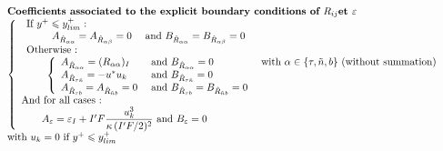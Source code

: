 \begin{equation}
\begin{array}{l}
\text{\bf Coefficients associated to the explicit boundary conditions of }
R_{ij} \text{\bf et } \varepsilon \\
\left\{\begin{array}{l}
\begin{array}{l}
\text{If }y^+\leqslant y^+_{lim}\text{~:}\\
\qquad\begin{array}{lll}
      A_{\hat R_{\alpha\alpha}} = A_{\hat R_{\alpha\beta}} = 0  &\text{ and } B_{\hat R_{\alpha\alpha}} =B_{\hat R_{\alpha\beta}}= 0 &
      \end{array}\\
\text{Otherwise~:}\\
\qquad\left\{\begin{array}{lll}
      A_{\hat R_{\alpha\alpha}} = (R_{\alpha\alpha})_I  &\text{ and } B_{\hat R_{\alpha\alpha}} = 0
         &\text{ with }\alpha \in \{\tau,\tilde{n},b\}\text{ (without summation)}\\
      A_{\hat R_{\tau \tilde{n}}} = -u^*u_k   &\text{ and } B_{\hat R_{\tau \tilde{n}}} = 0 &\\
      A_{\hat R_{\tau  b}} = A_{\hat R_{\tilde{n} b}} = 0   &\text{ and } B_{\hat R_{\tau b}} =B_{\hat R_{\tilde{n} b}} = 0 &\\
      \end{array}\right.
\end{array}\\
\text{And for all cases~:}\\
\qquad A_\varepsilon=\varepsilon_{I}+I'F\displaystyle\frac{ u_k^3}{\kappa\, (I'F/2)^2} \text{ and } B_\varepsilon= 0
\end{array}\right.\\
\text{with } u_k = 0 \text { if } y^+\leqslant y^+_{lim}
\end{array}
\end{equation}

